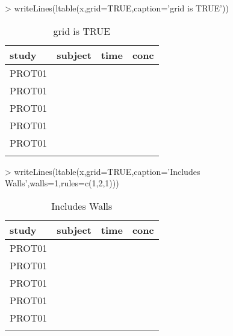 \documentclass[titlepage]{article}
\begin{document}
\begin{Schunk}
\begin{Sinput}
> writeLines(ltable(x,grid=TRUE,caption='grid is TRUE'))
\end{Sinput}
\begin{table}[!htpb]
 \caption[grid is TRUE]{grid is TRUE }
 \begin{center}
  \begin{tabular}{l|r|r|r}
    \hline \hline
   study & subject & time & conc \\ \hline
   PROT01 & \verb#1001# & \verb#0# & \verb#0.12# \\ \hline
   PROT01 & \verb#1001# & \verb#1# & \verb#34.00# \\ \hline
   PROT01 & \verb#1001# & \verb#2# & \verb#5.60# \\ \hline
   PROT01 & \verb#1002# & \verb#0# & \verb#0.50# \\ \hline
   PROT01 & \verb#1002# & \verb#1# & \verb#200.00# \\ \hline
    & \verb#1002# & \verb#2# & \verb## \\ \hline
  \end{tabular}
 \end{center}
\end{table}\end{Schunk}
\begin{Schunk}
\begin{Sinput}
> writeLines(ltable(x,grid=TRUE,caption='Includes Walls',walls=1,rules=c(1,2,1)))
\end{Sinput}
\begin{table}[!htpb]
 \caption[Includes Walls]{Includes Walls }
 \begin{center}
  \begin{tabular}{|l|r|r|r|}
    \hline
   study & subject & time & conc \\ \hline \hline
   PROT01 & \verb#1001# & \verb#0# & \verb#0.12# \\ \hline
   PROT01 & \verb#1001# & \verb#1# & \verb#34.00# \\ \hline
   PROT01 & \verb#1001# & \verb#2# & \verb#5.60# \\ \hline
   PROT01 & \verb#1002# & \verb#0# & \verb#0.50# \\ \hline
   PROT01 & \verb#1002# & \verb#1# & \verb#200.00# \\ \hline
    & \verb#1002# & \verb#2# & \verb## \\ \hline
  \end{tabular}
 \end{center}
\end{table}\end{Schunk}
\end{document}
